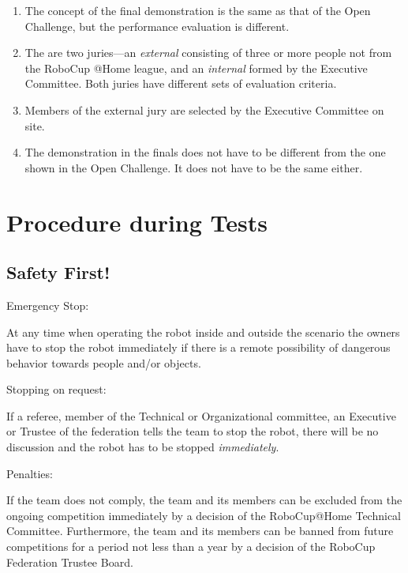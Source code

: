 \begin{enumerate}
  \begin{enumerate}
  \item The concept of the final demonstration is the same as that of the Open Challenge, but the performance evaluation is different. 
  \item The are two juries---an \emph{external} consisting of three or more people not from the RoboCup @Home league, and an \emph{internal} formed by the Executive Committee. Both juries have different sets of evaluation criteria.
  \item Members of the external jury are selected by the Executive Committee on site. 
  \item The demonstration in the finals does not have to be different from the one shown in the Open Challenge. It does not have to be the same either.
  \end{enumerate}
\end{enumerate}


\section{Procedure during Tests}

\subsection{Safety First!}\label{rule:safetyfirst}
\begin{enumerate}
{\bf\item Emergency Stop:} At any time when operating the robot inside and outside the 
  scenario the owners have to stop the robot immediately if there is a remote possibility 
  of dangerous behavior towards people and/or objects. 
{\bf\item Stopping on request:} If a referee, member of the Technical or Organizational 
  committee, an Executive or Trustee of the federation tells the team to stop the robot, 
  there will be no discussion and the robot has to be stopped \emph{immediately}.
{\bf\item Penalties:} If the team does not comply, the team and its members can be excluded 
  from the ongoing competition immediately by a decision of the RoboCup@Home Technical Committee. 
  Furthermore, the team and its members can be banned from future competitions for a period 
  not less than a year by a decision of the RoboCup Federation Trustee Board.
\end{enumerate}



